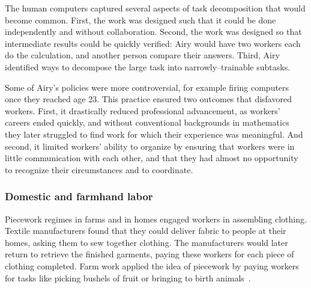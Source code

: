 \documentclass[trackingWork]{subfiles}
\begin{document}
The human computers captured several aspects of task decomposition that would become common. 
First, the work was designed such that it could be done independently and without collaboration. 
Second, the work was designed so that intermediate results could be quickly verified: Airy would have two workers each do the calculation, and another person compare their answers.
Third, Airy identified ways to decompose the large task into narrowly--trainable subtasks.

Some of Airy's policies were more controversial, for example
firing computers once they reached age 23.
This practice ensured two outcomes that disfavored workers.
First, it drastically reduced professional advancement, as
workers' careers ended quickly,
and without conventional backgrounds in mathematics
they later struggled to find work for which their experience was meaningful.
And second, it limited workers' ability to organize
by ensuring that workers were in little communication with each other,
and that they had almost no opportunity to recognize their circumstances and
to coordinate.



\subsubsection{Domestic and farmhand labor}

\begin{comment}
What did I pull from the threads that are related to domestic/farmwork?

- Graves: sparks of Scientific Management in Piecework, especially starting here
- 19th century: piecework was mostly cottage industry with untrained or informally trained workers
  (unlike industrial metal workers during WWII)
- Brown: Task variability matters
- Clark: pieceworkers work harder, more diligently, etc...
- Riis saw terrible conditions, documented and communicated it to the world

\citeauthor{clark1908cotton} observed textile mill pieceworkers and reported,
``When he works by the day the Italian operative wishes to leave before the whistle blows,
but if he works by the piece he will work as many hours as it is possible for him to stand''~\cite{clark1908cotton}.
\end{comment}

Piecework regimes in farms and in homes engaged workers in assembling clothing. %
Textile manufacturers found that they could deliver fabric to people at their homes, asking them to sew together clothing.
The manufacturers would later return to retrieve the finished garments,
paying these workers for each piece of clothing completed. 
Farm work applied the idea of piecework by
paying workers for tasks like picking bushels of fruit or bringing to birth animals~\cite{10.2307/2338394}.
\end{document}
